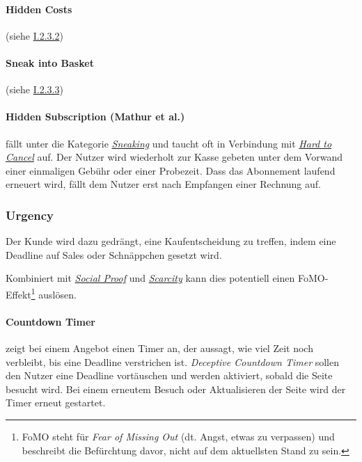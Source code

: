 \documentclass[a4paper]{article}
\begin{document}
\paragraph{Hidden Costs}
\label{para:hidden_costs2}
(siehe \hyperref[para:hidden_costs]{I.2.3.2})

\paragraph{Sneak into Basket}
\label{para:sneak_into_basket2}
(siehe \hyperref[para:sneak_into_basket]{I.2.3.3}) 

\paragraph{Hidden Subscription (Mathur et al.)}
\label{para:hidden_subscription}
fällt unter die Kategorie \hyperref[sssec:sneaking]{\textit{Sneaking}} und taucht oft in Verbindung mit \hyperref[para:hard_to_cancel]{\textit{Hard to Cancel}} auf.\newline
Der Nutzer wird wiederholt zur Kasse gebeten unter dem Vorwand einer einmaligen Gebühr oder einer Probezeit. Dass das Abonnement laufend erneuert wird, fällt dem Nutzer erst nach Empfangen einer Rechnung auf.  

\subsubsection{Urgency}
\label{sssec:urgency}

Der Kunde wird dazu gedrängt, eine Kaufentscheidung zu treffen, indem eine Deadline auf Sales oder Schnäppchen gesetzt wird. 

Kombiniert mit \hyperref[sssec:social_proof]{\textit{Social Proof}} und \hyperref[sssec:scarcity]{\textit{Scarcity}} kann dies potentiell einen FoMO-Effekt\footnote{\label{foot:4} FoMO steht für \textit{Fear of Missing Out} (dt. Angst, etwas zu verpassen) und beschreibt die Befürchtung davor, nicht auf dem aktuellsten Stand zu sein.} auslösen.

\paragraph{Countdown Timer}
\label{para:countdown_timer}
zeigt bei einem Angebot einen Timer an, der aussagt, wie viel Zeit noch verbleibt, bis eine Deadline verstrichen ist. \textit{Deceptive Countdown Timer} sollen den Nutzer eine Deadline vortäuschen und werden aktiviert, sobald die Seite besucht wird. Bei einem erneutem Besuch oder Aktualisieren der Seite wird der Timer erneut gestartet.
\end{document}
